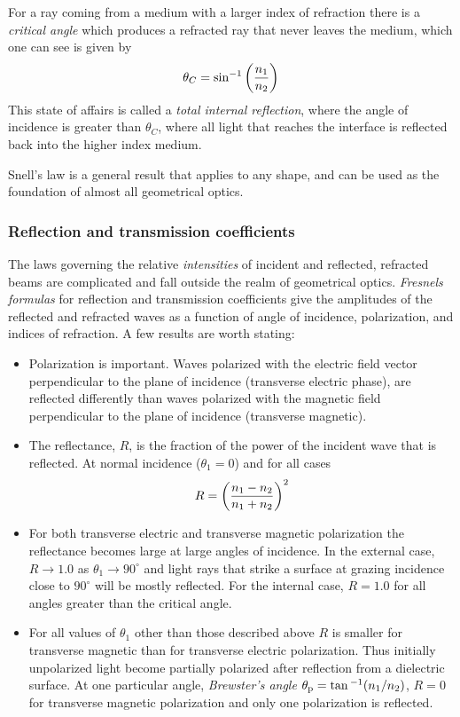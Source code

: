 \documentclass{article}
\begin{document}
For a ray coming
from a medium with a larger index of refraction there is a {\it critical angle} which 
produces a refracted ray that never leaves the medium, which one can see is given by 
\[
\theta_C=\sin^{-1}\left({n_1\over n_2}\right)
\]
This state of affairs is called a {\it total internal reflection}, where the angle of incidence is greater
than $\theta_C$, where all light that reaches the interface is reflected back into the higher index
medium. 

Snell's law is a general result that applies to any shape, and can be used as the foundation of 
almost all geometrical optics.

\subsubsection{Reflection and transmission coefficients}

The laws governing the relative {\it intensities} of incident and
reflected, refracted beams are complicated and fall outside the realm
of geometrical optics. {\it Fresnels formulas} for reflection and
transmission coefficients give the amplitudes of the reflected and
refracted waves as a function of angle of incidence, polarization, and
indices of refraction. A few results are worth stating:
\begin{itemize}
\item Polarization is important. Waves polarized with the electric
  field vector perpendicular to the plane of incidence (transverse
  electric phase), are reflected differently than waves polarized with
  the magnetic field perpendicular to the plane of incidence
  (transverse magnetic).
\item The reflectance, $R$, is the fraction of the power of the
  incident wave that is reflected. At normal incidence ($\theta_1=0$)
  and for all cases \[ R=\left({n_1-n_2\over n_1+n_2}\right)^2 \]
\item For both transverse electric and transverse magnetic
  polarization the reflectance becomes large at large angles of
  incidence. In the external case, $R\rightarrow 1.0$ as
  $\theta_1\rightarrow 90^{\circ}$ and light rays that strike a
  surface at grazing incidence close to $90^{\circ}$ will be mostly
  reflected. For the internal case, $R=1.0$ for all angles greater
  than the critical angle.
\item For all values of $\theta_1$ other than those described above
  $R$ is smaller for transverse magnetic than for transverse electric
  polarization. Thus initially unpolarized light become partially
  polarized after reflection from a dielectric surface. At one
  particular angle, {\it Brewster's angle} $\theta_{\rm
    p}=\tan{^{-1}({n_1/n_2})}$, $R=0$ for transverse magnetic
  polarization and only one polarization is reflected.
\end{itemize}
\end{document}
